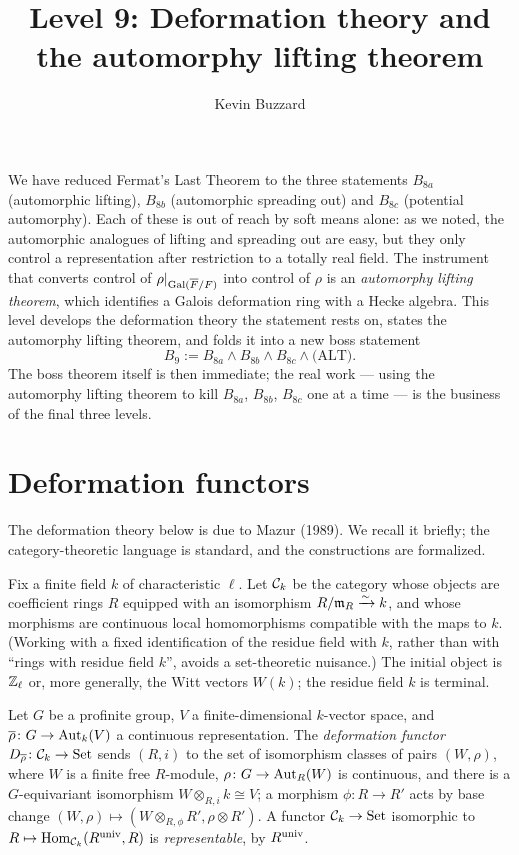 \documentclass[11pt]{article}
\title{Level 9: Deformation theory and the automorphy lifting theorem}
\author{Kevin Buzzard}
\date{}
\begin{document}
\maketitle

\noindent
We have reduced Fermat's Last Theorem to the three statements $B_{8a}$
(automorphic lifting), $B_{8b}$ (automorphic spreading out) and $B_{8c}$
(potential automorphy). Each of these is out of reach by soft means alone: as
we noted, the automorphic analogues of lifting and spreading out are easy, but
they only control a representation after restriction to a totally real field.
The instrument that converts control of $\rho|_{\operatorname{Gal}(\overline{F}/F)}$ into control of $\rho$ is
an \emph{automorphy lifting theorem}, which identifies a Galois deformation
ring with a Hecke algebra. This level develops the deformation theory the
statement rests on, states the automorphy lifting theorem, and folds it into a
new boss statement
\[
  B_9 := B_{8a}\wedge B_{8b}\wedge B_{8c}\wedge \text{(ALT)}.
\]
The boss theorem itself is then immediate; the real work --- using the
automorphy lifting theorem to kill $B_{8a}$, $B_{8b}$, $B_{8c}$ one at a time
--- is the business of the final three levels.

\section{Deformation functors}

The deformation theory below is due to Mazur (1989). We recall it briefly; the
category-theoretic language is standard, and the constructions are formalized.

Fix a finite field $k$ of characteristic $\ell$. Let $\mathcal{C}_k$ be the category
whose objects are coefficient rings $R$ equipped with an isomorphism
$R/\mathfrak{m}_R\xrightarrow{\sim}k$, and whose morphisms are continuous local
homomorphisms compatible with the maps to $k$. (Working with a fixed
identification of the residue field with $k$, rather than with ``rings with
residue field $k$'', avoids a set-theoretic nuisance.) The initial object is
$\mathbb{Z}_\ell$ or, more generally, the Witt vectors $W(k)$; the residue field $k$ is
terminal.

Let $G$ be a profinite group, $V$ a finite-dimensional $k$-vector space, and
$\overline{\rho}\colon G\to\operatorname{Aut}_k(V)$ a continuous representation. The \emph{deformation
functor} $D_{\overline{\rho}}\colon\mathcal{C}_k\to\mathrm{Set}$ sends $(R,i)$ to the set of
isomorphism classes of pairs $(W,\rho)$, where $W$ is a finite free $R$-module,
$\rho\colon G\to\operatorname{Aut}_R(W)$ is continuous, and there is a $G$-equivariant
isomorphism $W\otimes_{R,i}k\cong V$; a morphism $\phi\colon R\to R'$ acts by
base change $(W,\rho)\mapsto(W\otimes_{R,\phi}R',\rho\otimes R')$. A functor
$\mathcal{C}_k\to\mathrm{Set}$ isomorphic to $R\mapsto\operatorname{Hom}_{\mathcal{C}_k}(R^{\mathrm{univ}},R)$ is
\emph{representable}, by $R^{\mathrm{univ}}$.
\end{document}
